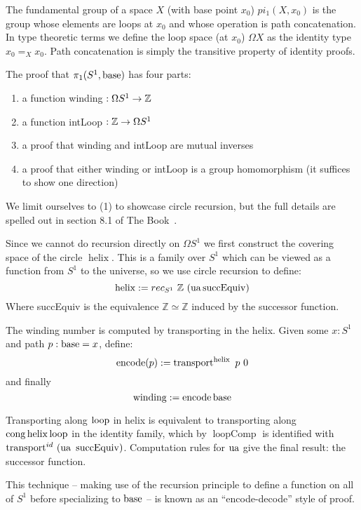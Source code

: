 The fundamental group of a space $X$ (with base point $x_0$) $pi_1(X, x_0)$ is
the group whose elements are loops at $x_0$ and whose operation is path
concatenation. In type theoretic terms we define the loop space (at $x_0$) $\Omega X$ as the
identity type $x_0 =_X x_0$. Path concatenation is simply the transitive
property of identity proofs.

The proof that $\pi_1(S^1, \operatorname{base})$ has four parts:
\begin{enumerate}
  \item a function winding $: \Omega S^1 \rightarrow \mathbb{Z}$
  \item a function intLoop $: \mathbb{Z} \rightarrow \Omega S^1$
  \item a proof that winding and intLoop are mutual inverses
  \item a proof that either winding or intLoop is a group homomorphism (it
    suffices to show one direction)
\end{enumerate}
We limit ourselves to (1) to showcase circle recursion, but the full
details are spelled out in section 8.1 of The Book~\cite{hottbook}.

Since we cannot do recursion directly on $\Omega S^1$ we first construct the
covering space of the circle $\operatorname{helix}$. This is a family over $S^1$
which can be viewed as a function from $S^1$ to the universe, so we use circle
recursion to define:
\[
  \operatorname{helix} := rec_{S^1} ~ \mathbb{Z} ~ (\operatorname{ua} \operatorname{succEquiv})
\]
Where succEquiv is the equivalence $\mathbb{Z} \simeq \mathbb{Z}$ induced by the
successor function.

The winding number is computed by transporting in the helix. Given some $x:S^1$
and path $p : \operatorname{base} = x$, define:
\[
  \operatorname{encode}(p) := \operatorname{transport}^{\operatorname{helix}}~p~0
\]
and finally
\[
  \operatorname{winding} := \operatorname{encode} \operatorname{base}
\]

Transporting along $\operatorname{loop}$ in helix is equivalent to transporting along
$\operatorname{cong} \operatorname{helix} \operatorname{loop}$ in the identity family, which by $\operatorname{loopComp}$
is identified with $\operatorname{transport}^{id}~(\operatorname{ua}~\operatorname{succEquiv})$. Computation
rules for $\operatorname{ua}$ give the final result: the successor function.

This technique -- making use of the recursion principle to define a function on
all of $S^1$ before specializing to $\operatorname{base}$ -- is known as an ``encode-decode''
style of proof.